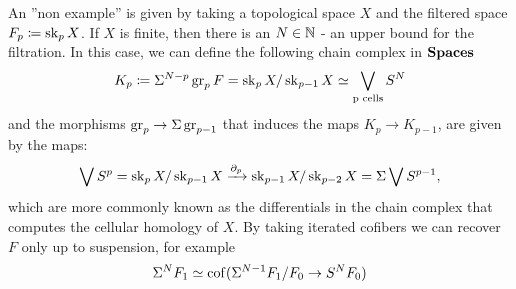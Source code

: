 \begin{rem}\label{ex:CW_skl}
    An ''non example'' is given by taking a topological space $X$ and the filtered space $F_p \coloneq \operatorname{sk}_p X$.
    If $X$ is finite, then there is an $N \in \mathbb{N}$ - an upper bound for the filtration.
    In this case, we can define the following chain complex in $\mathbf{Spaces}$
    \begin{equation*}
        K_p \coloneqq \Sigma^{N-p} \operatorname{gr}_p F= \operatorname{sk}_p X / \operatorname{sk}_{p-1} X \simeq \bigvee_{\text{p cells}} S^N
    \end{equation*}
    and the morphisms $\operatorname{gr}_p \to \Sigma \operatorname{gr}_{p-1}$ that induces the maps $K_p \to K_{p-1}$, are given by the maps:
    \begin{equation*}
        \bigvee S^p = \operatorname{sk}_p X / \operatorname{sk}_{p-1} X \xrightarrow{\partial_p} \operatorname{sk}_{p-1} X / \operatorname{sk}_{p-2} X = \Sigma \bigvee S^{p-1},
    \end{equation*}
    which are more commonly known as the differentials in the chain complex that computes the cellular homology of $X$.
    By taking iterated cofibers we can recover $F$ only up to suspension, for example
    \begin{equation*}
        \Sigma^N F_1 \simeq \operatorname{cof}(\Sigma^{N-1} F_1 /F_0 \to S^N F_0)
    \end{equation*}
\end{rem}
